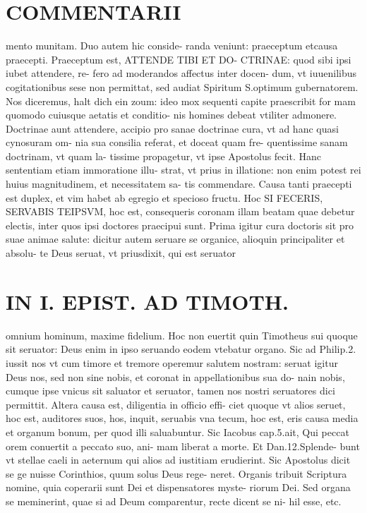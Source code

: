 \documentclass{article}
\begin{document}
\begin{pages}
\section*{COMMENTARII }
\marginpar{[ p.114 ]}\pstart mento munitam. Duo autem hic conside- randa veniunt: praeceptum etcausa praecepti. Praeceptum est, ATTENDE TIBI ET DO- CTRINAE: quod sibi ipsi iubet attendere, re- fero ad moderandos affectus inter docen- dum, vt iuuenilibus cogitationibus sese non permittat, sed audiat Spiritum S.optimum gubernatorem. Nos diceremus, halt dich ein zoum: ideo mox sequenti capite praescribit for mam quomodo cuiusque aetatis et conditio- nis homines debeat vtiliter admonere.  \pend\pstart Doctrinae aunt attendere, accipio pro sanae doctrinae cura, vt ad hanc quasi cynosuram om- nia sua consilia referat, et doceat quam fre- quentissime sanam doctrinam, vt quam la- tissime propagetur, vt ipse Apostolus fecit. Hanc sententiam etiam immoratione illu- strat, vt prius in illatione: non enim potest rei huius magnitudinem, et necessitatem sa- tis commendare.  \pend\pstart Causa tanti praecepti est duplex, et vim habet ab egregio et specioso fructu. Hoc SI FECERIS, SERVABIS TEIPSVM, hoc est, consequeris coronam illam beatam quae debetur electis, inter quos ipsi doctores praecipui sunt. Prima igitur cura doctoris sit pro suae animae salute: dicitur autem seruare se organice, alioquin principaliter et absolu- te Deus seruat, vt priusdixit, qui est seruator  \pend
\section*{IN I. EPIST. AD TIMOTH. }
\marginpar{[ p.115 ]}\pstart omnium hominum, maxime fidelium. Hoc non euertit quin Timotheus sui quoque sit seruator: Deus enim in ipso seruando eodem vtebatur organo. Sic ad Philip.2. iussit nos vt cum timore et tremore operemur salutem nostram: seruat igitur Deus nos, sed non sine nobis, et coronat in appellationibus sua do- nain nobis, cumque ipse vnicus sit saluator et seruator, tamen nos nostri seruatores dici permittit.  \pend\pstart Altera causa est, diligentia in officio effi- ciet quoque vt alios seruet, hoc est, auditores suos, hos, inquit, seruabis vna tecum, hoc est, eris causa media et organum bonum, per quod illi saluabuntur. Sic Iacobus cap.5.ait, Qui peccat orem conuertit a peccato suo, ani- mam liberat a morte. Et Dan.12.Splende- bunt vt stellae caeli in aeternum qui alios ad iustitiam erudierint. Sic Apostolus dicit se ge nuisse Corinthios, quum solus Deus rege- neret.  \pend\pstart Organis tribuit Scriptura nomine, quia coperarii sunt Dei et dispensatores myste- riorum Dei. Sed organa se meminerint, quae si ad Deum comparentur, recte dicent se ni- hil esse, etc.  \pend

\end{pages}
\end{document}
